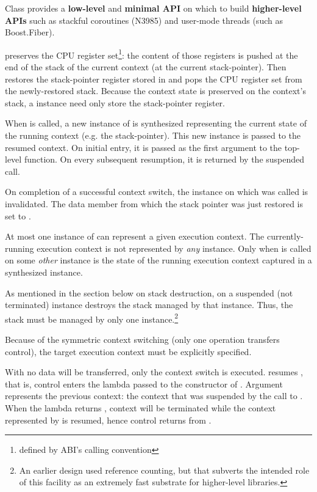 Class \ectx provides a {\bfseries low-level} and {\bfseries minimal API} on
which to build {\bfseries higher-level APIs} such as stackful coroutines
(N3985\cite{N3985}) and user-mode threads (such as Boost.Fiber\cite{bfiber}).


\ectxop preserves the CPU register set\footnote{defined by ABI's calling
convention}: the content of those registers is pushed at the end of the stack
of the current context (at the current stack-pointer). Then \op restores the
stack-pointer register stored in  and pops the CPU register set
from the newly-restored stack.
Because the context state is preserved on the context's stack, a \ectx
instance need only store the stack-pointer register.


When \ectxop is called, a new instance of \ectx is synthesized representing
the current state of the running context (e.g. the stack-pointer). This new
instance is passed to the resumed context. On initial entry, it is passed as
the first argument to the top-level function. On every subsequent resumption,
it is returned by the suspended \op call.

On completion of a successful context switch, the
\ectx instance on which \op was called is invalidated. The data member from
which the stack pointer was just restored is set to .

At most one instance of \ectx can represent a given execution context. The
currently-running execution context is not represented by \emph{any} \ectx
instance. Only when \op is called on some \emph{other} \ectx instance is the
state of the running execution context captured in a synthesized \ectx
instance.

As mentioned in the section below on stack
destruction,  on a suspended (not terminated)
instance destroys the stack managed by that instance. Thus, the stack must be
managed by only one \ectx instance.\footnote{An earlier design used reference
counting, but that subverts the intended role of this facility as an extremely
fast substrate for higher-level libraries.}

Because of the symmetric context switching (only one operation transfers
control), the target execution context must be explicitly specified.


With  no data will be transferred, only the
context switch is executed.
 resumes , that is, control enters the lambda passed to
the constructor of . Argument  represents the previous
context: the context that was suspended by the call to . When the
lambda returns , context  will be terminated while the
context represented by  is resumed, hence control returns
from .\\


